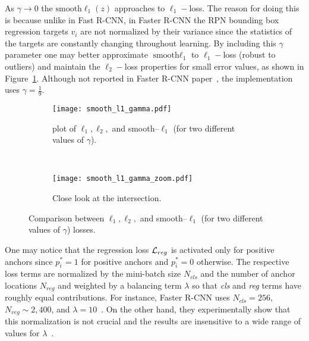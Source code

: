 %
As $\gamma \rightarrow 0$ the $\textrm{smooth}\ell_1 (z)$ approaches to $\ell_1-$loss.
The reason for doing this is because unlike in Fast R-CNN, in Faster R-CNN the RPN bounding box regression targets $v_i$  are not normalized by their variance since the statistics of the targets are constantly changing throughout learning.
By including this $\gamma$ parameter one may better approximate $\textrm{smooth}\ell_1$ to $\ell_1-$loss (robust to outliers) and maintain the $\ell_2-$loss properties for small error values, as shown in Figure~\ref{fig:l1_loss_gamma}.
Although not reported in Faster R-CNN paper~\cite{Ren2017fasterpami}, the implementation uses $\gamma = \frac{1}{9}$.
%
\begin{figure}[th!]
  \centering
  \begin{subfigure}[t]{0.49\linewidth}
    \centering
    \texttt{[image: smooth\_l1\_gamma.pdf]}
    \caption{plot of $\ell_1, \ell_2,$ and smooth--$\ell_1$ (for two different values of $\gamma$).}
  \end{subfigure}~
  \begin{subfigure}[t]{0.49\linewidth}
    \centering
    \texttt{[image: smooth\_l1\_gamma\_zoom.pdf]}
    \caption{Close look at the intersection.}
  \end{subfigure}
  \caption[Comparison between $\ell_1, \ell_2,$ and smooth--$\ell_1$.]{Comparison between $\ell_1, \ell_2,$ and smooth--$\ell_1$ (for two different values of $\gamma$) losses.}
  \label{fig:l1_loss_gamma}
\end{figure}


%
One may notice that the regression loss $\mathcal{L}_{reg}$ is activated only for positive anchors since $p_i^*=1$ for positive anchors and $p_i^*=0$ otherwise.
%
The respective loss terms are normalized by the mini-batch size ${N_{cls}}$ and the number of anchor locations ${N_{reg}}$ and weighted by a balancing term $\lambda$ so that {\it cls} and {\it reg} terms have roughly equal contributions.
For instance, Faster R-CNN uses ${N_{cls}} = 256$, ${N_{reg}}\sim2,400$, and $\lambda=10$~\cite{Ren2017fasterpami}.
On the other hand, they experimentally show that this normalization is not crucial and the results are insensitive to a wide range of values for $\lambda$~\cite{Ren2017fasterpami}.
%

